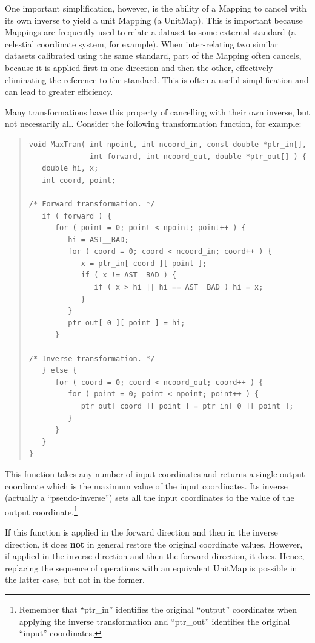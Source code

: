 \documentclass[twoside,11pt]{article}
\newcommand{\htmlref}[2]{#1}
\begin{document}
One important simplification, however, is the ability of a \htmlref{Mapping}{Mapping} to
cancel with its own inverse to yield a unit Mapping (a \htmlref{UnitMap}{UnitMap}). This
is important because Mappings are frequently used to relate a dataset
to some external standard (a celestial coordinate system, for
example). When inter-relating two similar datasets calibrated using
the same standard, part of the Mapping often cancels, because it is
applied first in one direction and then the other, effectively
eliminating the reference to the standard. This is often a useful
simplification and can lead to greater efficiency.

Many transformations have this property of cancelling with their own
inverse, but not necessarily all. Consider the following
transformation function, for example:

\begin{quote}
\small
\begin{verbatim}
void MaxTran( int npoint, int ncoord_in, const double *ptr_in[],
              int forward, int ncoord_out, double *ptr_out[] ) {
   double hi, x;
   int coord, point;

/* Forward transformation. */
   if ( forward ) {
      for ( point = 0; point < npoint; point++ ) {
         hi = AST__BAD;
         for ( coord = 0; coord < ncoord_in; coord++ ) {
            x = ptr_in[ coord ][ point ];
            if ( x != AST__BAD ) {
               if ( x > hi || hi == AST__BAD ) hi = x;
            }
         }
         ptr_out[ 0 ][ point ] = hi;
      }

/* Inverse transformation. */
   } else {
      for ( coord = 0; coord < ncoord_out; coord++ ) {
         for ( point = 0; point < npoint; point++ ) {
            ptr_out[ coord ][ point ] = ptr_in[ 0 ][ point ];
         }
      }      
   }
}
\end{verbatim}
\normalsize
\end{quote}

This function takes any number of input coordinates and returns a
single output coordinate which is the maximum value of the input
coordinates. Its inverse (actually a ``pseudo-inverse'') sets all the
input coordinates to the value of the output
coordinate.\footnote{Remember that ``ptr\_in'' identifies the original
``output'' coordinates when applying the inverse transformation and
``ptr\_out'' identifies the original ``input'' coordinates.}

If this function is applied in the forward direction and then in the
inverse direction, it does {\bf{not}} in general restore the original
coordinate values. However, if applied in the inverse direction and
then the forward direction, it does. Hence, replacing the sequence of
operations with an equivalent UnitMap is possible in the latter case,
but not in the former.
\end{document}
